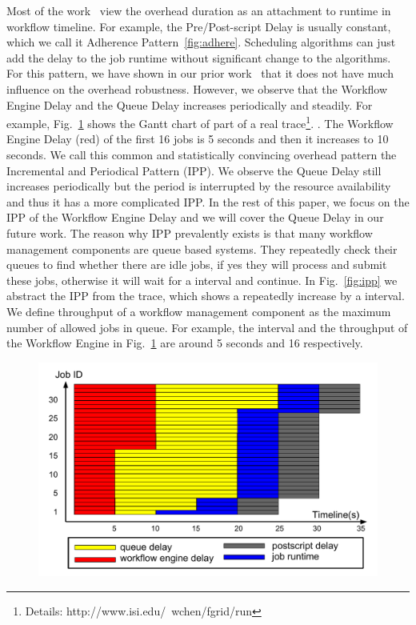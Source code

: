 \documentclass[final]{IEEEtran}
\begin{document}
Most of the work~\cite{} view the overhead duration as an attachment to runtime in workflow timeline. For example, the Pre/Post-script Delay is usually constant, which we call it Adherence Pattern~\ref{fig:adhere}. Scheduling algorithms can just add the delay to the job runtime without significant change to the algorithms. For this pattern, we have shown in our prior work~\cite{Chen} that it does not have much influence on the overhead robustness. 
However, we observe that the Workflow Engine Delay and the Queue Delay increases periodically and steadily. For example, Fig.~\ref{fig:trace} shows the Gantt chart of part of a real trace\footnote{Details: http://www.isi.edu/\string~wchen/fgrid/run}. 
. The Workflow Engine Delay (red) of the first 16 jobs is 5 seconds and then it increases to 10 seconds. 
We call this common and statistically convincing overhead pattern the Incremental and Periodical Pattern (IPP). We observe the Queue Delay still increases periodically but the period is interrupted by the resource availability and thus it has a more complicated IPP. In the rest of this paper, we focus on the IPP of the Workflow Engine Delay and we will cover the Queue Delay in our future work. 
The reason why IPP prevalently exists is that many workflow management components are queue based systems. They repeatedly check their queues to find whether there are idle jobs, if yes they will process and submit these jobs, otherwise it will wait for a interval and continue. In Fig.~\ref{fig:ipp} we abstract the IPP from the trace, which shows a repeatedly increase by a interval. We define throughput of a workflow management component as the maximum number of allowed jobs in queue. For example, the interval and the throughput of the Workflow Engine in Fig.~\ref{fig:trace} are around 5 seconds and 16 respectively. 


\begin{figure}[htb]
\centering
 \includegraphics[width=1\linewidth]{figure/trace.pdf}
  \label{fig:trace}
  \vspace{-10pt}
\end{figure}
\end{document}
